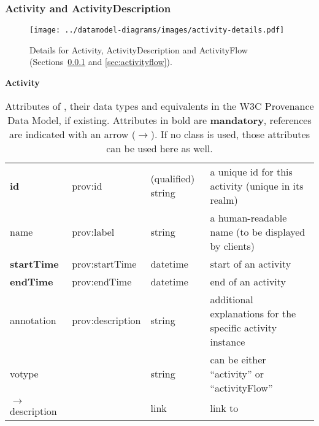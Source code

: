 
\subsubsection{Activity and ActivityDescription}
\label{sec:activity}

\begin{figure}[h]
\centering
\texttt{[image: ../datamodel-diagrams/images/activity-details.pdf]}
\caption[Details for Activity, ActivityDescription and ActivityFlow]{Details for Activity, ActivityDescription and ActivityFlow (Sections~\ref{sec:activity} and \ref{sec:activityflow}).
}
\label{fig:activity-details}
\end{figure}

\begin{table}[h]

\small
{}\textwidth

\textbf{\normalsize Activity}\vspace{0.25em}\\
\begin{tabulary}{1.0\textwidth}{@{}lp{3.5cm}p{2cm}L@{}}
\toprule
{} &  &  & \\
\midrule
\textbf{id} & prov:id  & (qualified) string & a unique id for this activity (unique in its realm)\\
name        & prov:label  & string & a human-readable name (to be displayed by clients)\\
\textbf{startTime} & prov:startTime & datetime & start of an activity\\
\textbf{endTime} & prov:endTime  & datetime & end of an activity\\
annotation        & prov:description & string & additional explanations for the specific activity instance\\
votype & & string & can be either ``activity'' or ``activityFlow''\\
\midrule
$\rightarrow$ description &  & link & link to \\
\bottomrule
\end{tabulary}
\caption[Attributes of .]{Attributes of , their data types and equivalents in the W3C Provenance 
Data Model, if existing. Attributes in bold are \textbf{mandatory}, references are indicated with an arrow ($\rightarrow$). If no  class is used, those attributes can be used here as well.}
\end{table}


